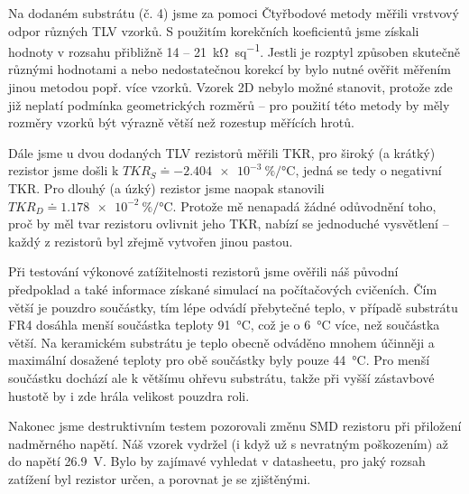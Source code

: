 Na dodaném substrátu (č. 4) jsme za pomoci Čtyřbodové metody měřili vrstvový odpor různých TLV vzorků. S použitím korekčních koeficientů jsme získali hodnoty v rozsahu přibližně 14 -- \qty{21}{\kilo\ohm\per sq}. Jestli je rozptyl způsoben skutečně různými hodnotami a nebo nedostatečnou korekcí by bylo nutné ověřit měřením jinou metodou popř. více vzorků. Vzorek 2D nebylo možné stanovit, protože zde již neplatí podmínka geometrických rozměrů -- pro použití této metody by měly rozměry vzorků být výrazně větší než rozestup měřících hrotů. 

Dále jsme u dvou dodaných TLV rezistorů měřili TKR, pro široký (a krátký) rezistor jsme došli k \(TKR_{S} \doteq \qty{-2,404e-3}{\percent\per\degreeCelsius}\), jedná se tedy o negativní TKR. Pro dlouhý (a úzký) rezistor jsme naopak stanovili \(TKR_{D} \doteq \qty{1,178e-2}{\percent\per\degreeCelsius}\). Protože mě nenapadá žádné odůvodnění toho, proč by měl tvar rezistoru ovlivnit jeho TKR, nabízí se jednoduché vysvětlení -- každý z rezistorů byl zřejmě vytvořen jinou pastou. 

Při testování výkonové zatížitelnosti rezistorů jsme ověřili náš původní předpoklad a také informace získané simulací na počítačových cvičeních. Čím větší je pouzdro součástky, tím lépe odvádí přebytečné teplo, v případě substrátu FR4 dosáhla menší součástka teploty \qty{91}{\degreeCelsius}, což je o \qty{6}{\degreeCelsius} více, než součástka větší. Na keramickém substrátu je teplo obecně odváděno mnohem účinněji a maximální dosažené teploty pro obě součástky byly pouze \qty{44}{\degreeCelsius}. Pro menší součástku dochází ale k většímu ohřevu substrátu, takže při vyšší zástavbové hustotě by i zde hrála velikost pouzdra roli. 

Nakonec jsme destruktivním testem pozorovali změnu SMD rezistoru při přiložení nadměrného napětí. Náš vzorek vydržel (i když už s nevratným poškozením) až do napětí \qty{26,9}{V}. Bylo by zajímavé vyhledat v datasheetu, pro jaký rozsah zatížení byl rezistor určen, a porovnat je se zjištěnými. 